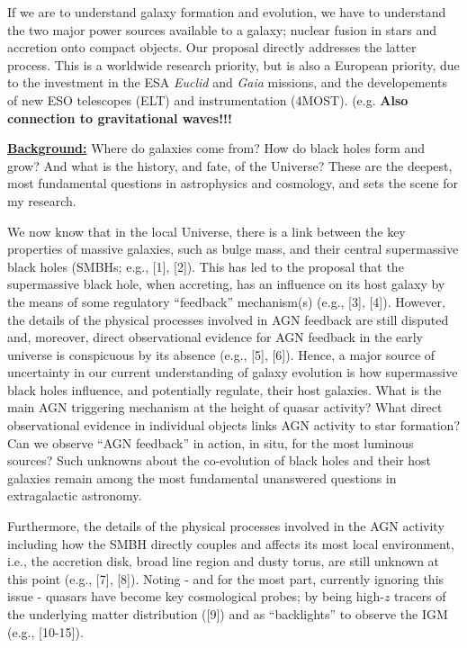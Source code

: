 \documentclass[oneside, a4paper, onecolumn, 11pt]{article}
\begin{document}
If we are to understand galaxy formation and evolution, we have to understand the two major power sources available to a galaxy; nuclear fusion in stars and accretion onto compact objects. Our proposal directly addresses the latter process. This is 
a worldwide research priority, but is also a European priority, due to the investment in the ESA {\it Euclid} and {\it Gaia} missions, and the developements of new ESO telescopes (ELT) and instrumentation (4MOST). 
(e.g. 
{\bf Also connection to gravitational waves!!!} 

\noindent
{\bf \underline {Background:}}
Where do galaxies come from? How do black holes form and grow? And
what is the history, and fate, of the Universe?  These are the
deepest, most fundamental questions in astrophysics and cosmology, and
sets the scene for my research.

\smallskip 
\smallskip
\noindent
We now know that in the local Universe, there is a link between the
key properties of massive galaxies, such as bulge mass, and their
central supermassive black holes (SMBHs; e.g., [1], [2]). This has led
to the proposal that the supermassive black hole, when accreting, has
an influence on its host galaxy by the means of some regulatory
``feedback'' mechanism(s) (e.g., [3], [4]). However, the details of
the physical processes involved in AGN feedback are still disputed
and, moreover, direct observational evidence for AGN feedback in the
early universe is conspicuous by its absence (e.g., [5], [6]). Hence,
a major source of uncertainty in our current understanding of galaxy
evolution is how supermassive black holes influence, and potentially
regulate, their host galaxies.
What is the main AGN triggering mechanism at the height of quasar
activity? What direct observational evidence in individual objects
links AGN activity to star formation?  Can we observe ``AGN feedback''
in action, in situ, for the most luminous sources?  Such unknowns
about the co-evolution of black holes and their host galaxies remain
among the most fundamental unanswered questions in extragalactic
astronomy.


\smallskip 
\smallskip
\noindent
Furthermore, the details of the physical processes involved in the AGN
activity including how the SMBH directly couples and affects its most
local environment, i.e., the accretion disk, broad line region and
dusty torus, are still unknown at this point (e.g., [7], [8]). Noting
- and for the most part, currently ignoring this issue - quasars have
become key cosmological probes; by being high-$z$ tracers of the
underlying matter distribution ([9]) and as ``backlights'' to observe
the IGM (e.g., [10-15]).
\end{document}

